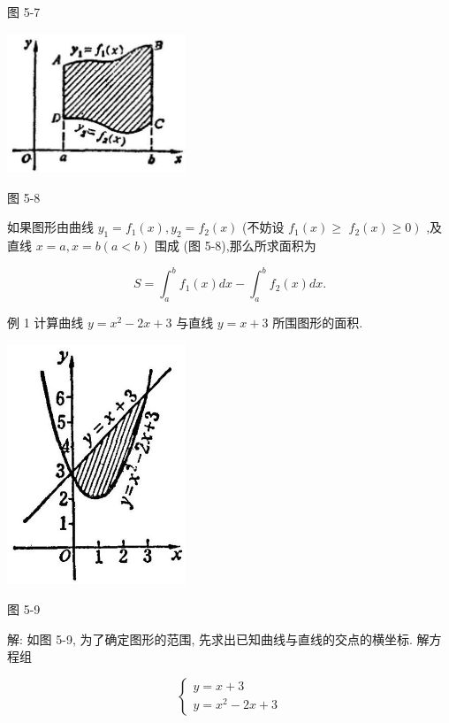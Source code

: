 \documentclass[lang=cn,newtx,10pt,scheme=chinese]{elegantbook}
\begin{document}
图 5-7

\begin{center}
\includegraphics[max width=0.4\textwidth]{images/01912c18-5c3f-733d-b775-749ba9897a9d_232_995714.jpg}
\end{center}

图 5-8

如果图形由曲线 \({y}_{1} = {f}_{1}\left( x\right) ,{y}_{2} = {f}_{2}\left( x\right)\) (不妨设 \({f}_{1}\left( x\right) \geq\) \(\left. {{f}_{2}\left( x\right) \geq 0}\right)\) ,及直线 \(x = a,x = b\left( {a < b}\right)\) 围成 (图 5-8),那么所求面积为

\[
S = {\int }_{a}^{b}{f}_{1}\left( x\right) {dx} - {\int }_{a}^{b}{f}_{2}\left( x\right) {dx}.
\]

例 1 计算曲线 \(y = {x}^{2} - {2x} + 3\) 与直线 \(y = x + 3\) 所围图形的面积.

\begin{center}
\includegraphics[max width=0.4\textwidth]{images/01912c18-5c3f-733d-b775-749ba9897a9d_232_503568.jpg}
\end{center}

图 5-9

解: 如图 5-9, 为了确定图形的范围, 先求出已知曲线与直线的交点的横坐标. 解方程组

\[
\left\{ \begin{array}{l} y = x + 3 \\ y = {x}^{2} - {2x} + 3 \end{array}\right.
\]
\end{document}
